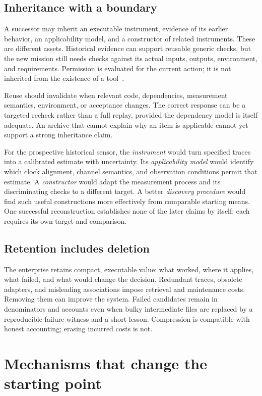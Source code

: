 \documentclass[10pt,a4paper]{article}
\begin{document}
\subsection{Inheritance with a boundary}

A successor may inherit an executable instrument, evidence of its earlier behavior, an applicability model, and a constructor of related instruments. These are different assets. Historical evidence can support reusable generic checks, but the new mission still needs checks against its actual inputs, outputs, environment, and requirements. Permission is evaluated for the current action; it is not inherited from the existence of a tool~\citep{enterprises}.

Reuse should invalidate when relevant code, dependencies, measurement semantics, environment, or acceptance changes. The correct response can be a targeted recheck rather than a full replay, provided the dependency model is itself adequate. An archive that cannot explain why an item is applicable cannot yet support a strong inheritance claim.

For the prospective historical sensor, the \emph{instrument} would turn specified traces into a calibrated estimate with uncertainty. Its \emph{applicability model} would identify which clock alignment, channel semantics, and observation conditions permit that estimate. A \emph{constructor} would adapt the measurement process and its discriminating checks to a different target. A better \emph{discovery procedure} would find such useful constructions more effectively from comparable starting means. One successful reconstruction establishes none of the later claims by itself; each requires its own target and comparison.

\subsection{Retention includes deletion}

The enterprise retains compact, executable value: what worked, where it applies, what failed, and what would change the decision. Redundant traces, obsolete adapters, and misleading associations impose retrieval and maintenance costs. Removing them can improve the system. Failed candidates remain in denominators and accounts even when bulky intermediate files are replaced by a reproducible failure witness and a short lesson. Compression is compatible with honest accounting; erasing incurred costs is not.

\section{Mechanisms that change the starting point}\label{sec:mechanisms}
\end{document}
